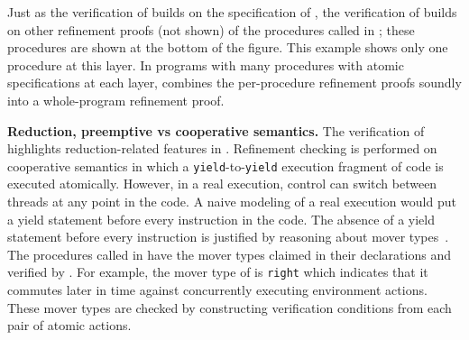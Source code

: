 Just as the verification of  builds on the specification of ,
the verification of  builds on other refinement proofs (not shown) 
of the procedures called in ;
these procedures are shown at the bottom of the figure. 
This example shows only one procedure at this layer. In programs
with many procedures with atomic specifications at each layer,
\civl combines the per-procedure refinement proofs soundly into a
whole-program refinement proof. 

{\bf Reduction, preemptive vs cooperative semantics.}
The verification of  highlights reduction-related features
in \civl. 
Refinement checking is performed on cooperative semantics in which a 
{\tt yield}-to-{\tt yield} execution fragment of code is executed atomically.
However, in a real execution, control can switch between threads at any point in the code. 
A naive modeling of a real execution would put a yield statement before every instruction in the code.
The absence of a yield statement before every instruction is justified by reasoning about mover types~\cite{FlanaganFLQ08}. 
The procedures called in  have the mover types claimed in their
declarations and verified by \civl. 
For example, the mover type of  is {\tt right} which indicates 
that it commutes later in time against concurrently executing
environment actions. 
These mover types are checked by constructing verification conditions from each pair of atomic actions.


